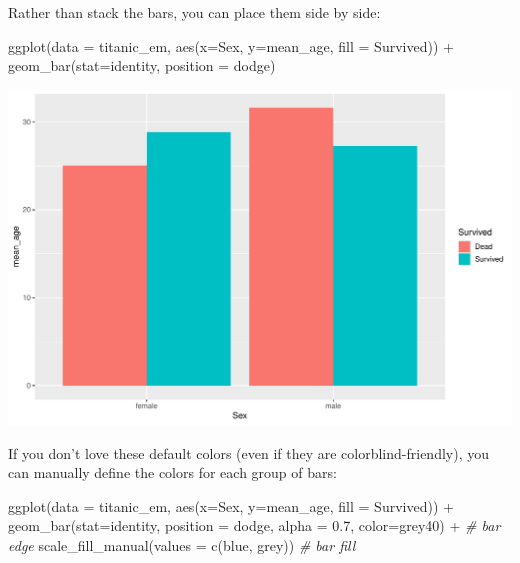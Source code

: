\documentclass[
]{book}
\newenvironment{Shaded}{\begin{snugshade}}{\end{snugshade}}
\newcommand{\AttributeTok}[1]{\textcolor[rgb]{0.77,0.63,0.00}{#1}}
\newcommand{\CommentTok}[1]{\textcolor[rgb]{0.56,0.35,0.01}{\textit{#1}}}
\newcommand{\FloatTok}[1]{\textcolor[rgb]{0.00,0.00,0.81}{#1}}
\newcommand{\FunctionTok}[1]{\textcolor[rgb]{0.00,0.00,0.00}{#1}}
\newcommand{\NormalTok}[1]{#1}
\newcommand{\SpecialCharTok}[1]{\textcolor[rgb]{0.00,0.00,0.00}{#1}}
\newcommand{\StringTok}[1]{\textcolor[rgb]{0.31,0.60,0.02}{#1}}
\begin{document}
Rather than stack the bars, you can place them side by side:

\begin{Shaded}
\begin{Highlighting}[]
\FunctionTok{ggplot}\NormalTok{(}\AttributeTok{data =}\NormalTok{ titanic\_em, }
       \FunctionTok{aes}\NormalTok{(}\AttributeTok{x=}\NormalTok{Sex, }\AttributeTok{y=}\NormalTok{mean\_age, }\AttributeTok{fill =}\NormalTok{ Survived)) }\SpecialCharTok{+}
  \FunctionTok{geom\_bar}\NormalTok{(}\AttributeTok{stat=}\StringTok{\textquotesingle{}identity\textquotesingle{}}\NormalTok{, }\AttributeTok{position =} \StringTok{\textquotesingle{}dodge\textquotesingle{}}\NormalTok{) }
\end{Highlighting}
\end{Shaded}

\includegraphics[width=694.08px]{figures/unnamed-chunk-170-1}

If you don't love these default colors (even if they are colorblind-friendly), you can manually define the colors for each group of bars:

\begin{Shaded}
\begin{Highlighting}[]
\FunctionTok{ggplot}\NormalTok{(}\AttributeTok{data =}\NormalTok{ titanic\_em, }
       \FunctionTok{aes}\NormalTok{(}\AttributeTok{x=}\NormalTok{Sex, }\AttributeTok{y=}\NormalTok{mean\_age, }\AttributeTok{fill =}\NormalTok{ Survived)) }\SpecialCharTok{+}
  \FunctionTok{geom\_bar}\NormalTok{(}\AttributeTok{stat=}\StringTok{\textquotesingle{}identity\textquotesingle{}}\NormalTok{, }
           \AttributeTok{position =} \StringTok{\textquotesingle{}dodge\textquotesingle{}}\NormalTok{, }
           \AttributeTok{alpha =} \FloatTok{0.7}\NormalTok{, }
           \AttributeTok{color=}\StringTok{\textquotesingle{}grey40\textquotesingle{}}\NormalTok{) }\SpecialCharTok{+} \CommentTok{\# bar edge}
  \FunctionTok{scale\_fill\_manual}\NormalTok{(}\AttributeTok{values =} \FunctionTok{c}\NormalTok{(}\StringTok{\textquotesingle{}blue\textquotesingle{}}\NormalTok{, }\StringTok{\textquotesingle{}grey\textquotesingle{}}\NormalTok{)) }\CommentTok{\# bar fill}
\end{Highlighting}
\end{Shaded}
\end{document}
